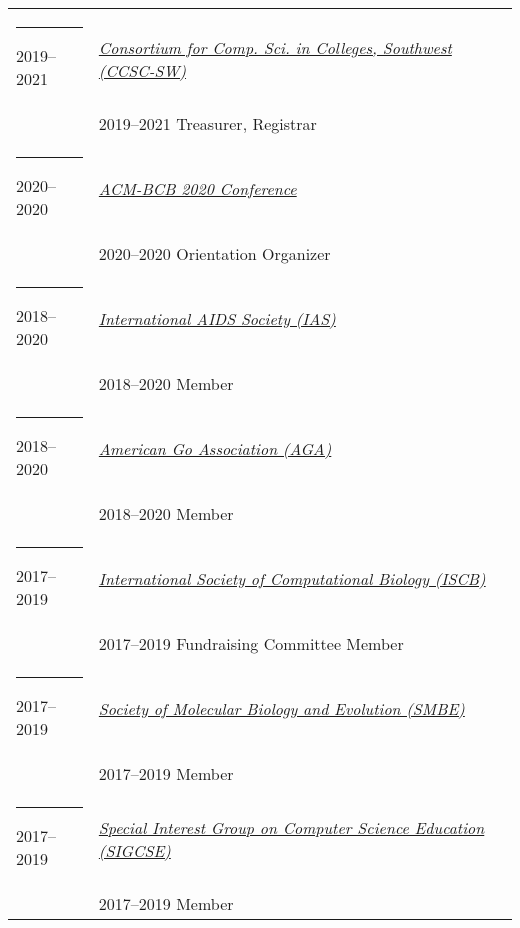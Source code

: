 \documentclass[margin,line]{res}
\begin{document}
\begin{resume}
\begin{longtable}{@{}p{0.7in}p{4in}}
\hspace*{-4mm} \rule{-1mm}{5mm} 2019--2021 & \href{http://www.ccsc.org/southwestern/index.php}{\textit{Consortium for Comp. Sci. in Colleges, Southwest (CCSC-SW)}}\\*
\hspace*{-4mm} & \hspace{4mm} 2019--2021 Treasurer, Registrar\\
\hspace*{-4mm} \rule{-1mm}{5mm} 2020--2020 & \href{https://acm-bcb.org/2020}{\textit{ACM-BCB 2020 Conference}}\\*
\hspace*{-4mm} & \hspace{4mm} 2020--2020 Orientation Organizer\\
\hspace*{-4mm} \rule{-1mm}{5mm} 2018--2020 & \href{https://www.iasociety.org/}{\textit{International AIDS Society (IAS)}}\\*
\hspace*{-4mm} & \hspace{4mm} 2018--2020 Member\\
\hspace*{-4mm} \rule{-1mm}{5mm} 2018--2020 & \href{http://www.usgo.org/}{\textit{American Go Association (AGA)}}\\*
\hspace*{-4mm} & \hspace{4mm} 2018--2020 Member\\
\hspace*{-4mm} \rule{-1mm}{5mm} 2017--2019 & \href{https://www.iscb.org/}{\textit{International Society of Computational Biology (ISCB)}}\\*
\hspace*{-4mm} & \hspace{4mm} 2017--2019 Fundraising Committee Member\\
\hspace*{-4mm} \rule{-1mm}{5mm} 2017--2019 & \href{http://www.smbe.org/}{\textit{Society of Molecular Biology and Evolution (SMBE)}}\\*
\hspace*{-4mm} & \hspace{4mm} 2017--2019 Member\\
\hspace*{-4mm} \rule{-1mm}{5mm} 2017--2019 & \href{https://sigcse.org/}{\textit{Special Interest Group on Computer Science Education (SIGCSE)}}\\*
\hspace*{-4mm} & \hspace{4mm} 2017--2019 Member\\
\end{longtable}


\end{resume}
\end{document}
